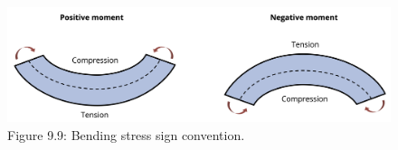 \documentclass[
  letterpaper,
  DIV=11,
  numbers=noendperiod]{scrreprt}
\theoremstyle{definition}
\theoremstyle{remark}
\begin{document}
\begin{figure}[H]

{\centering \includegraphics[width=5.19792in,height=\textheight]{images/CH9 PNGs/Figure 9.9.png}

}

\caption{Figure 9.9: Bending stress sign convention.}

\end{figure}%
\end{document}
